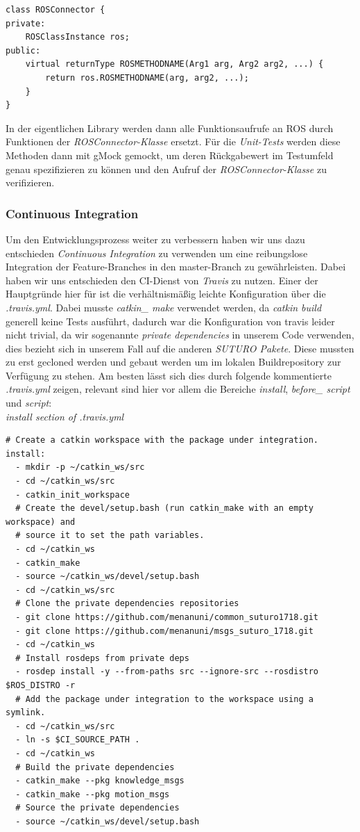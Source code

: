 \documentclass{suturo}
\begin{document}
\begin{verbatim}
class ROSConnector {
private:
    ROSClassInstance ros;
public:
    virtual returnType ROSMETHODNAME(Arg1 arg, Arg2 arg2, ...) {
        return ros.ROSMETHODNAME(arg, arg2, ...);
    }
}
\end{verbatim}

In der eigentlichen Library werden dann alle Funktionsaufrufe an ROS durch Funktionen der \textit{ROSConnector-Klasse} ersetzt. Für die \textit{Unit-Tests} werden diese Methoden dann mit gMock gemockt, um deren Rückgabewert im Testumfeld genau spezifizieren zu können und den Aufruf der \textit{ROSConnector-Klasse} zu verifizieren.



\subsubsection{Continuous Integration}
Um den Entwicklungsprozess weiter zu verbessern haben wir uns dazu entschieden \textit{Continuous Integration} zu verwenden um eine reibungslose Integration der Feature-Branches in den master-Branch zu gewährleisten. Dabei haben wir uns entschieden den CI-Dienst von \textit{Travis} zu nutzen. Einer der Hauptgründe hier für ist die verhältnismäßig leichte Konfiguration über die \textit{.travis.yml}. Dabei musste \textit{catkin\_ make} verwendet werden, da \textit{catkin build} generell keine Tests ausführt, dadurch war die Konfiguration von travis leider nicht trivial, da wir sogenannte \textit{private dependencies} in unserem Code verwenden, dies bezieht sich in unserem Fall auf die anderen \textit{SUTURO Pakete}. Diese mussten zu erst gecloned werden und gebaut werden um im lokalen Buildrepository zur Verfügung zu stehen. Am besten lässt sich dies durch folgende kommentierte \textit{.travis.yml} zeigen, relevant sind hier vor allem die Bereiche \textit{install}, \textit{before\_ script} und \textit{script}: \\

\textit{install section of .travis.yml}
\begin{verbatim}
# Create a catkin workspace with the package under integration.
install:
  - mkdir -p ~/catkin_ws/src
  - cd ~/catkin_ws/src
  - catkin_init_workspace
  # Create the devel/setup.bash (run catkin_make with an empty workspace) and
  # source it to set the path variables.
  - cd ~/catkin_ws
  - catkin_make
  - source ~/catkin_ws/devel/setup.bash
  - cd ~/catkin_ws/src
  # Clone the private dependencies repositories
  - git clone https://github.com/menanuni/common_suturo1718.git
  - git clone https://github.com/menanuni/msgs_suturo_1718.git
  - cd ~/catkin_ws 
  # Install rosdeps from private deps
  - rosdep install -y --from-paths src --ignore-src --rosdistro $ROS_DISTRO -r
  # Add the package under integration to the workspace using a symlink.
  - cd ~/catkin_ws/src
  - ln -s $CI_SOURCE_PATH .
  - cd ~/catkin_ws
  # Build the private dependencies
  - catkin_make --pkg knowledge_msgs
  - catkin_make --pkg motion_msgs
  # Source the private dependencies
  - source ~/catkin_ws/devel/setup.bash
\end{verbatim}
\end{document}
